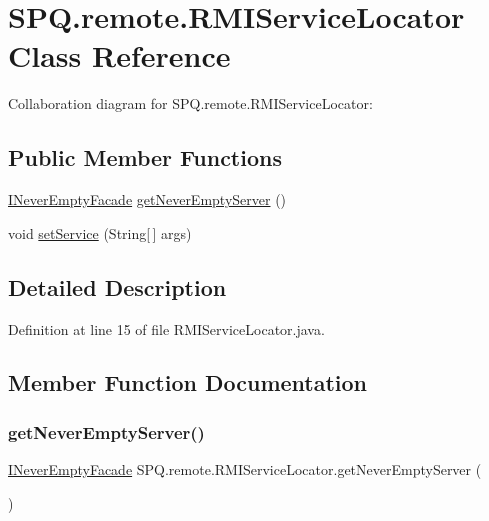 \hypertarget{class_s_p_q_1_1remote_1_1_r_m_i_service_locator}{}\section{S\+P\+Q.\+remote.\+R\+M\+I\+Service\+Locator Class Reference}
\label{class_s_p_q_1_1remote_1_1_r_m_i_service_locator}


Collaboration diagram for S\+P\+Q.\+remote.\+R\+M\+I\+Service\+Locator\+:
\subsection*{Public Member Functions}
\begin{DoxyCompactItemize}
\item 
\mbox{\hyperlink{interface_s_p_q_1_1remote_1_1_i_never_empty_facade}{I\+Never\+Empty\+Facade}} \mbox{\hyperlink{class_s_p_q_1_1remote_1_1_r_m_i_service_locator_a19d79d8b31c278a127bf921895d889ae}{get\+Never\+Empty\+Server}} ()
\item 
void \mbox{\hyperlink{class_s_p_q_1_1remote_1_1_r_m_i_service_locator_ae4d529073f4b435fa3d0fedcaad0fc70}{set\+Service}} (String\mbox{[}$\,$\mbox{]} args)
\end{DoxyCompactItemize}


\subsection{Detailed Description}


Definition at line 15 of file R\+M\+I\+Service\+Locator.\+java.



\subsection{Member Function Documentation}
\mbox{\label{class_s_p_q_1_1remote_1_1_r_m_i_service_locator_a19d79d8b31c278a127bf921895d889ae}} 
\subsubsection{\texorpdfstring{get\+Never\+Empty\+Server()}{getNeverEmptyServer()}}
{\footnotesize\ttfamily \mbox{\hyperlink{interface_s_p_q_1_1remote_1_1_i_never_empty_facade}{I\+Never\+Empty\+Facade}} S\+P\+Q.\+remote.\+R\+M\+I\+Service\+Locator.\+get\+Never\+Empty\+Server (\begin{DoxyParamCaption}{ }\end{DoxyParamCaption})}



